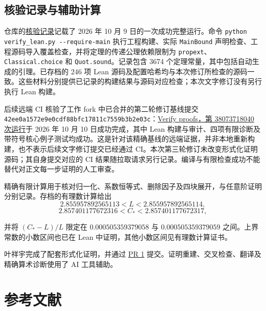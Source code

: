 \documentclass[11pt,a4paper]{article}
\begin{document}
\subsection{核验记录与辅助计算}\label{sec-A.2}

仓库的\href{https://github.com/LStar404/tournament-hamiltonian-paths/blob/8ea3fcffcc12b6a06294ba7559885b439eda3cac/formalization/VERIFICATION.md}{核验记录}记载了 2026 年 10 月 9 日的一次成功完整运行。命令 \texttt{python verify\_\allowbreak{}lean.\allowbreak{}py {-}{-}require{-}main} 执行工程构建、实际 \texttt{Main\allowbreak{}Bound} 声明检查、工程源码导入覆盖检查，并将定理的传递公理依赖限制为 \texttt{propext}、\texttt{Classical.\allowbreak{}choice} 和 \texttt{Quot.\allowbreak{}sound}。记录包含 3674 个定理常量，其中包括自动生成的引理。已存档的 246 项 Lean 源码及配置哈希均与本次修订所检查的源码一致。这些材料分别提供已记录的构建结果与源码对应检查；本次文字修订没有另行执行 Lean 构建。

后续远端 CI 核验了工作 fork 中已合并的第二轮修订基线提交 \texttt{42ee0a15\allowbreak{}72e9e0cd\allowbreak{}f88bfc17\allowbreak{}811c7559\allowbreak{}b3b2e03c}：\href{https://github.com/makerY666/tournament-hamiltonian-paths/actions/runs/38073718040}{Verify proofs，第 38073718040 次运行}于 2026 年 10 月 10 日成功完成，其中 Lean 构建与审计、四项有限诊断及带符号核心例子测试均成功。这是针对该精确基线的远端证据，并非本地重新构建，也不表示后续文字修订提交已经通过 CI。本次第三轮修订未改变形式化证明源码；其自身提交对应的 CI 结果随拉取请求另行记录。编译与有限检查成功不能替代对正文每一步证明的人工审查。

精确有限计算用于核对归一化、系数恒等式、删除因子及四块展开，与任意阶证明分别记录。存档的有理数计算给出
\[2.855957892565113<L<2.855957892565114,\]
\nopagebreak[3]\[2.857401177672316<C_*<2.857401177672317,\]

并将 \((C_*-L)/L\) 限定在 \(0.000505359379058\) 与 \(0.000505359379059\) 之间。上界常数的小数区间也已在 Lean 中证明，其他小数区间见有理数计算证书。

叶祥宇完成了配套形式化证明，并通过 \href{https://github.com/LStar404/tournament-hamiltonian-paths/pull/1}{PR 1} 提交。证明重建、交叉检查、翻译及精确算术诊断使用了 AI 工具辅助。

\section*{参考文献}
\label{sec-references}\small
\end{document}
